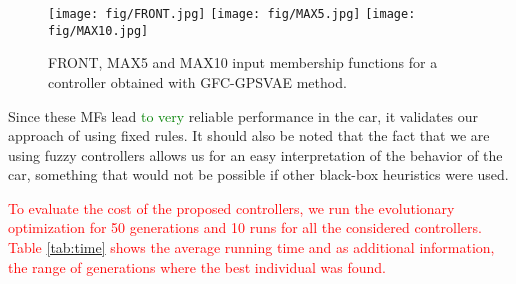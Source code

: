 \documentclass[10pt,journal,compsoc]{IEEEtran}
\begin{document}
%
\begin{figure}[h]	
  \begin{center}
    \texttt{[image: fig/FRONT.jpg]}
    \texttt{[image: fig/MAX5.jpg]}
    \texttt{[image: fig/MAX10.jpg]}		
    \caption{FRONT, MAX5 and MAX10 input membership functions for a controller obtained with {\sf GFC-GPSVAE} method.}
    \label{fig:frontmfs}
\end{center}	
\end{figure}
%
Since these MFs lead \textcolor{green}{to very} reliable performance in the car, it
validates our approach of using fixed rules. It should
also be noted that the fact that we are using fuzzy controllers allows
us for an easy interpretation of the behavior of the car, something
that would not be possible if other black-box heuristics were used.

	\textcolor{red}{
To evaluate the cost of the proposed controllers, we run the evolutionary optimization for 50 generations and 10 runs for all the considered controllers.
 Table \ref{tab:time} shows the average running time and  as additional information, the range of generations where the best individual was found. } 
\end{document}
